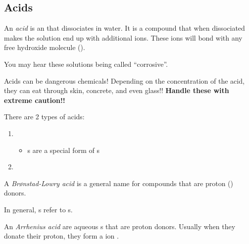 \subsection{Acids} \label{subsec:Acids}
\begin{definition}[Acid] \label{def:Acid}
  An \emph{acid} is an  that dissociates in water.
  It is a compound that when dissociated makes the solution end up with additional  ions.
  These ions will bond with any free hydroxide molecule ().
  \begin{remark}
    You may hear these solutions being called ``corrosive''.
  \end{remark}
  \begin{remark}
    Acids can be dangerous chemicals!
    Depending on the concentration of the acid, they can eat through skin, concrete, and even glass!!
    \textbf{Handle these with extreme caution!!}
  \end{remark}
\end{definition}

There are 2 types of acids:
\begin{enumerate}
  \item {}
  \begin{itemize}[noitemsep, nolistsep]
    \item {}s are a special form of s
  \end{itemize}
  \item {}
\end{enumerate}

\begin{definition} \label{def:Bronstad-Lowry Acid}
  A \emph{Br\o nstad-Lowry acid} is a general name for compounds that are proton () donors.
  
  \begin{remark}
    In general, s refer to s.
  \end{remark}
\end{definition}

\begin{definition} \label{def:Arrhenius Acid}
  An \emph{Arrhenius acid} are aqueous s that are proton donors.
  Usually when they donate their proton, they form a  ion .
\end{definition}

